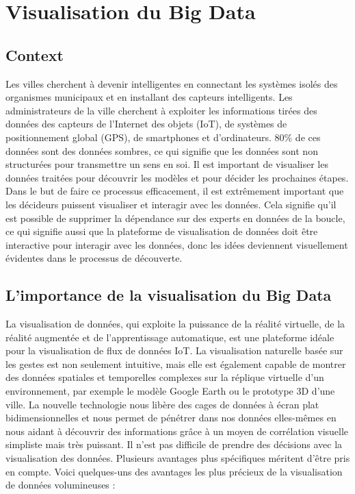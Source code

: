 \documentclass[french, a4paper, 12pt]{report}
\begin{document}
\section{Visualisation du Big Data }
\subsection{Context}
Les villes cherchent à devenir intelligentes en connectant les systèmes isolés des organismes municipaux et en installant des capteurs intelligents. Les administrateurs de la ville cherchent à exploiter les informations tirées des données des capteurs de l'Internet des objets (IoT), de systèmes de positionnement global (GPS), de smartphones et d'ordinateurs. 80\% de ces données sont des données sombres, ce qui signifie que les données sont non structurées pour transmettre un sens en soi.
Il est important de visualiser les données traitées pour découvrir les modèles et pour décider les prochaines étapes. Dans le but de faire ce processus efficacement, il est extrêmement important que les décideurs puissent visualiser et interagir avec les données.
Cela signifie qu'il est possible de supprimer la dépendance sur des experts en données de la boucle, ce qui signifie aussi que la plateforme de visualisation de données doit être interactive pour interagir avec les données, donc les idées deviennent visuellement évidentes dans le processus de découverte.

\subsection{L’importance de la visualisation du Big Data}
La visualisation de données, qui exploite la puissance de la réalité virtuelle, de la réalité augmentée et de l’apprentissage automatique, est une plateforme idéale pour la visualisation de flux de données IoT. La visualisation naturelle basée sur les gestes est non seulement intuitive, mais elle est également capable de montrer des données spatiales et temporelles complexes sur la réplique virtuelle d’un environnement, par exemple le modèle Google Earth ou le prototype 3D d’une ville.
La nouvelle technologie nous libère des cages de données à écran plat bidimensionnelles et nous permet de pénétrer dans nos données elles-mêmes en nous aidant à découvrir des informations grâce à un moyen de corrélation visuelle simpliste mais très puissant. Il n’est pas difficile de prendre des décisions avec la visualisation des données.
Plusieurs avantages plus spécifiques méritent d’être pris en compte. Voici quelques-uns des avantages les plus précieux de la visualisation de données volumineuses :
\end{document}
